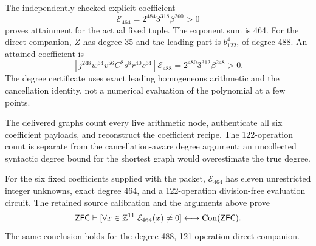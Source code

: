 The independently checked explicit coefficient
\begin{equation}
 [j^{260}w^{56}v^{64}C^4s^{12}r^{24}c^{32}h^{12}]\mathcal E_{464}
   =2^{484}3^{318}\beta^{260}>0
 \label{eq:leading464}
\end{equation}
proves attainment for the actual fixed tuple. The exponent sum is 464.
For the direct companion, $Z$ has degree 35 and the leading part is
$b_{122}^4$, of degree 488. An attained coefficient is
\[
 [j^{248}w^{64}v^{56}C^8s^8r^{40}c^{64}]\mathcal E_{488}
   =2^{480}3^{312}\beta^{248}>0.
\]
The degree certificate uses exact leading homogeneous arithmetic and
the cancellation identity, not a numerical evaluation of the polynomial
at a few points.

The delivered graphs count every live arithmetic node, authenticate all
six coefficient payloads, and reconstruct the coefficient recipe.
The 122-operation count is separate from the cancellation-aware degree
argument: an uncollected syntactic degree bound for the shortest graph
would overestimate the true degree.

\begin{theorem}\label{thm:eleven}
For the six fixed coefficients supplied with the packet,
$\mathcal E_{464}$ has eleven unrestricted integer unknowns, exact
degree 464, and a 122-operation division-free evaluation circuit.
The retained source calibration and the arguments above prove
\[
 \mathsf{ZFC}\vdash
 [\forall x\in\mathbb Z^{11}\;\mathcal E_{464}(x)\ne0]
 \longleftrightarrow\operatorname{Con}(\mathsf{ZFC}).
\]
The same conclusion holds for the degree-488, 121-operation direct
companion.
\end{theorem}
